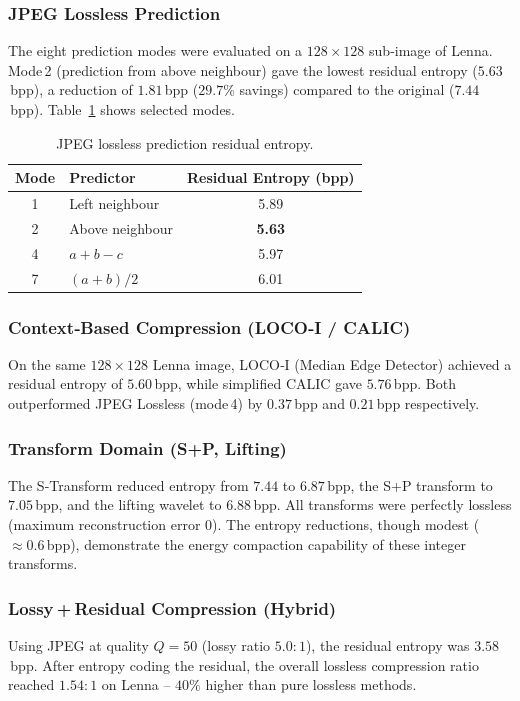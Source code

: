 \subsubsection{JPEG Lossless Prediction}
The eight prediction modes were evaluated on a $128\times128$ sub‑image of Lenna. Mode 2 (prediction from above neighbour) gave the lowest residual entropy ($5.63$ bpp), a reduction of $1.81$ bpp ($29.7\%$ savings) compared to the original ($7.44$ bpp). Table~\ref{tab:jpeg_results} shows selected modes.

\begin{table}[H]
\centering
\caption{JPEG lossless prediction residual entropy.}
\label{tab:jpeg_results}
\begin{tabular}{c l c}
\hline
\textbf{Mode} & \textbf{Predictor} & \textbf{Residual Entropy (bpp)} \\
\hline
1 & Left neighbour & 5.89 \\
2 & Above neighbour & \textbf{5.63} \\
4 & $a+b-c$ & 5.97 \\
7 & $(a+b)/2$ & 6.01 \\
\hline
\end{tabular}
\end{table}

\subsubsection{Context‑Based Compression (LOCO‑I / CALIC)}
On the same $128\times128$ Lenna image, LOCO‑I (Median Edge Detector) achieved a residual entropy of $5.60$ bpp, while simplified CALIC gave $5.76$ bpp. Both outperformed JPEG Lossless (mode 4) by $0.37$ bpp and $0.21$ bpp respectively.

\subsubsection{Transform Domain (S+P, Lifting)}
The S‑Transform reduced entropy from $7.44$ to $6.87$ bpp, the S+P transform to $7.05$ bpp, and the lifting wavelet to $6.88$ bpp. All transforms were perfectly lossless (maximum reconstruction error $0$). The entropy reductions, though modest ($\approx 0.6$ bpp), demonstrate the energy compaction capability of these integer transforms.

\subsubsection{Lossy + Residual Compression (Hybrid)}
Using JPEG at quality $Q=50$ (lossy ratio $5.0:1$), the residual entropy was $3.58$ bpp. After entropy coding the residual, the overall lossless compression ratio reached $1.54:1$ on Lenna – $40\%$ higher than pure lossless methods.

